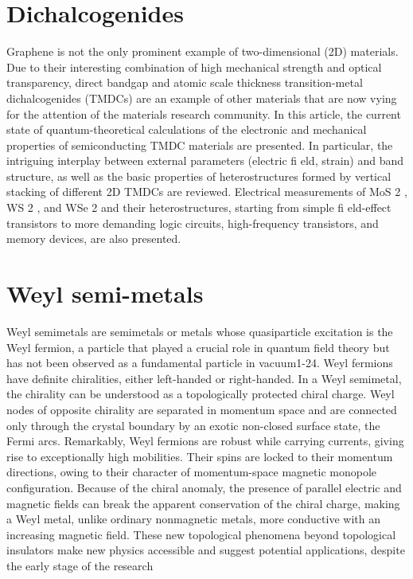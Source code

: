 \section{Dichalcogenides}

Graphene is not the only prominent example of two-dimensional (2D) materials. Due to their
interesting combination of high mechanical strength and optical transparency, direct bandgap
and atomic scale thickness transition-metal dichalcogenides (TMDCs) are an example of
other materials that are now vying for the attention of the materials research community. In this
article, the current state of quantum-theoretical calculations of the electronic and mechanical
properties of semiconducting TMDC materials are presented. In particular, the intriguing
interplay between external parameters (electric fi eld, strain) and band structure, as well as
the basic properties of heterostructures formed by vertical stacking of different 2D TMDCs
are reviewed. Electrical measurements of MoS 2 , WS 2 , and WSe 2 and their heterostructures,
starting from simple fi eld-effect transistors to more demanding logic circuits, high-frequency
transistors, and memory devices, are also presented.

\section{Weyl semi-metals}
Weyl semimetals are semimetals
or metals whose quasiparticle
excitation is the Weyl fermion, a
particle that played a crucial role in quantum
field theory but has not been observed as a
fundamental particle in vacuum1-24. Weyl
fermions have definite chiralities, either
left-handed or right-handed. In a Weyl
semimetal, the chirality can be understood as
a topologically protected chiral charge. Weyl
nodes of opposite chirality are separated in
momentum space and are connected only
through the crystal boundary by an exotic
non-closed surface state, the Fermi arcs.
Remarkably, Weyl fermions are robust while
carrying currents, giving rise to exceptionally
high mobilities. Their spins are locked to
their momentum directions, owing to their
character of momentum-space magnetic
monopole configuration. Because of the
chiral anomaly, the presence of parallel
electric and magnetic fields can break the
apparent conservation of the chiral charge,
making a Weyl metal, unlike ordinary nonmagnetic
metals, more conductive with
an increasing magnetic field. These new
topological phenomena beyond topological
insulators make new physics accessible and
suggest potential applications, despite the
early stage of the research
